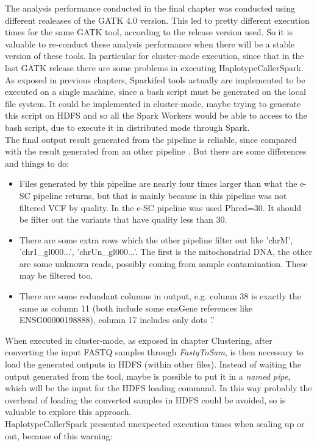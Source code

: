 The analysis performance conducted in the final chapter was conducted using different realeases of the GATK 4.0 version. This led to pretty different execution times for the same GATK tool, according to the release version used. So it is valuable to re-conduct these analysis performance when there will be a stable version of these tools. In particular for cluster-mode execution, since that in the last GATK release there are some problems in executing HaplotypeCallerSpark.
\\[1\baselineskip]
As exposed in previous chapters, Sparkifed tools actually are implemented to be executed on a single machine, since a bash script must be generated on the local file system. It could be implemented in cluster-mode, maybe trying to generate this script on HDFS and so all the Spark Workers would be able to access to the bash script, due to execute it in distributed mode through Spark.
\\[1\baselineskip]
The final output result generated from the pipeline is reliable, since compared with the result generated from an other pipeline \cite{ScalableEfficientWhole-ExomeProcessing}. But there are some differences and things to do:
\begin{itemize}
	\item Files generated by this pipeline are nearly four times larger than what the e-SC pipeline returns, but that is mainly because in this pipeline was not filtered VCF by quality. In the e-SC pipeline was used Phred=30. It should be filter out the variants that have quality less than 30.
    
    \item There are some extra rows which the other pipeline filter out like 'chrM', 'chr1\_gl000...', 'chrUn\_gl000...'. The first is the mitochondrial DNA, the other are some unknown reads, possibly coming from sample contamination. These may be filtered too.
    
    \item There are some redundant columns in output, e.g. column 38 is exactly the same as column 11 (both include some ensGene references like ENSG00000198888), column 17 includes only dots '.'
\end{itemize}

When executed in cluster-mode, as exposed in chapter Clustering, after converting the input FASTQ samples through \textit{FastqToSam}, is then necessary to load the generated outputs in HDFS (within other files). Instead of waiting the output generated from the tool, maybe is possible to put it in a \textit{named pipe}, which will be the input for the HDFS loading command. In this way probably the overhead of loading the converted samples in HDFS could be avoided, so is valuable to explore this approach.
\\[1\baselineskip]
HaplotypeCallerSpark presented unexpected execution times when scaling up or out, because of this warning:

